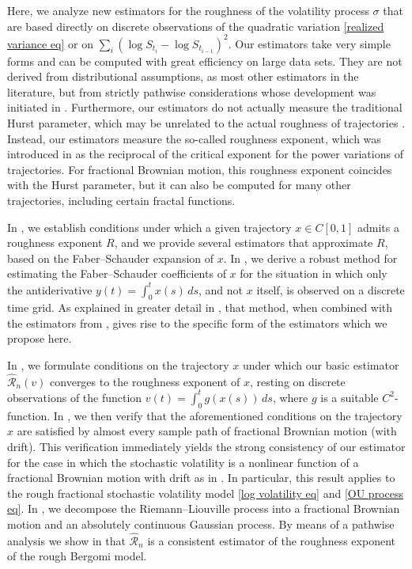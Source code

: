 \documentclass[12pt,reqno]{article}
\def\wh{\widehat}
\numberwithin{equation}{section}
\def\cR{{\mathscr R}}
\theoremstyle{definition}
\def\wh{\widehat}
\begin{document}
Here, we analyze new estimators for the roughness of the volatility process $\sigma$ that are based directly on discrete observations of the quadratic variation \eqref{realized variance eq} or on $\sum_i(\log S_{t_i}-\log S_{t_{i-1}})^2$. Our estimators take very simple forms and can be computed with great efficiency on large data sets. They are not derived from distributional assumptions, as most other estimators in the literature, but from strictly pathwise considerations whose development was initiated in \cite{HanSchiedMatrix, HanSchiedHurst}. Furthermore, our estimators do not actually measure the traditional Hurst parameter, which may be unrelated to the actual roughness of trajectories \cite{Gneiting2004Hurst}. Instead, our estimators measure the so-called roughness exponent, which was introduced in \cite{HanSchiedHurst} as the reciprocal of the critical exponent for the power variations of trajectories.
For fractional Brownian motion, this roughness exponent coincides with the Hurst parameter, but it can also be computed for many other trajectories, including certain fractal functions.

In \cite{HanSchiedHurst}, we establish conditions under which a given trajectory $x\in C[0,1]$ admits a roughness exponent $R$, and we provide several estimators that approximate $R$, based on the Faber--Schauder expansion of $x$. In \cite{HanSchiedMatrix}, we derive a robust method for estimating the Faber--Schauder coefficients of $x$ for the situation in which only the antiderivative $y(t)=\int_0^tx(s)\,ds$, and not $x$ itself, is observed on a discrete time grid. As explained in greater detail in , that method, when combined with the estimators from  \cite{HanSchiedHurst}, gives rise to the specific form of the estimators which we propose here.  

In , we formulate conditions on the trajectory $x$ under which our basic estimator $\wh \cR_n(v)$ converges to the roughness exponent of $x$, resting on discrete observations of the function $v(t)=\int_0^tg(x(s))\,ds$, where $g$ is a suitable $C^2$-function. In , we then verify that the aforementioned conditions on the trajectory $x$ are satisfied by almost every sample path of fractional Brownian motion (with drift). This verification immediately yields the strong consistency of our estimator for the case in which the stochastic volatility is a nonlinear function of a fractional Brownian motion with drift as in . In particular, this result applies to the rough fractional stochastic volatility model \eqref{log volatility eq} and \eqref{OU process eq}.  In , we decompose the Riemann--Liouville process into a fractional Brownian motion and an absolutely continuous Gaussian process. By means of a pathwise analysis we show  in  that $\wh \cR_n$ is a consistent estimator of the roughness exponent of the rough Bergomi model.
\end{document}
